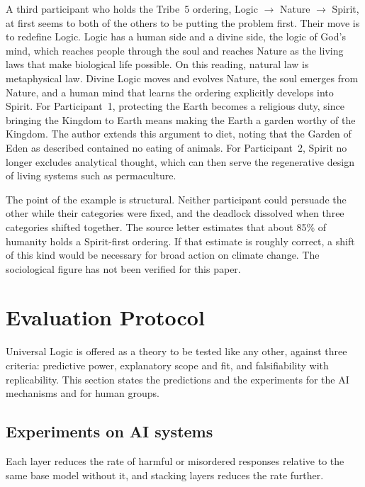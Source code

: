 \documentclass[twocolumn]{ulpaper}
\begin{document}
A third participant who holds the Tribe~5 ordering, Logic $\to$ Nature $\to$ Spirit, at first seems to both of the others to be putting the problem first. Their move is to redefine Logic. Logic has a human side and a divine side, the logic of God's mind, which reaches people through the soul and reaches Nature as the living laws that make biological life possible. On this reading, natural law is metaphysical law. Divine Logic moves and evolves Nature, the soul emerges from Nature, and a human mind that learns the ordering explicitly develops into Spirit. For Participant~1, protecting the Earth becomes a religious duty, since bringing the Kingdom to Earth means making the Earth a garden worthy of the Kingdom. The author extends this argument to diet, noting that the Garden of Eden as described contained no eating of animals. For Participant~2, Spirit no longer excludes analytical thought, which can then serve the regenerative design of living systems such as permaculture.

The point of the example is structural. Neither participant could persuade the other while their categories were fixed, and the deadlock dissolved when three categories shifted together. The source letter estimates that about 85\% of humanity holds a Spirit-first ordering. If that estimate is roughly correct, a shift of this kind would be necessary for broad action on climate change. The sociological figure has not been verified for this paper.

\section{Evaluation Protocol}
\label{sec:evaluation}

Universal Logic is offered as a theory to be tested like any other, against three criteria: predictive power, explanatory scope and fit, and falsifiability with replicability. This section states the predictions and the experiments for the AI mechanisms and for human groups.

\subsection{Experiments on AI systems}

\begin{hypothesis}
\label{hyp:layers}
Each layer reduces the rate of harmful or misordered responses relative to the same base model without it, and stacking layers reduces the rate further.
\end{hypothesis}
\end{document}
